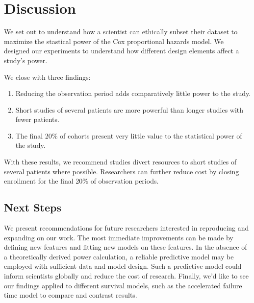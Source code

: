 \section{Discussion}

We set out to understand how a scientist can ethically subset their dataset to maximize the stastical power of the Cox proportional hazards model. We designed our experiments to understand how different design elements affect a study's power. 

We close with three findings:
%
\begin{enumerate}
    \item Reducing the observation period adds comparatively little power to the study.
    \item Short studies of several patients are more powerful than longer studies with fewer patients. 
    \item The final 20\% of cohorts present very little value to the statistical power of the study. 
\end{enumerate}
%
With these results, we recommend studies divert resources to short studies of several patients where possible. Researchers can further reduce cost by closing enrollment for the final 20\% of observation periods. 

\subsection{Next Steps}

We present recommendations for future researchers interested in reproducing and expanding on our work. The most immediate improvements can be made by defining new features and fitting new models on these features. In the absence of a theoretically derived power calculation, a reliable predictive model may be employed with sufficient data and model design. Such a predictive model could inform scientists globally and reduce the cost of research. Finally, we'd like to see our findings applied to different survival models, such as the accelerated failure time model to compare and contrast results. 
